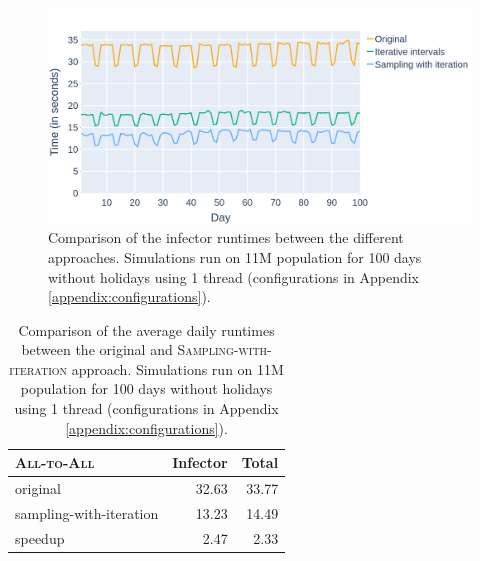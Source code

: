 \begin{figure}
    \centering
    \includegraphics[width=\linewidth]{4 - Sampling/fig/sampling_with_iteration/swi_vs_rest_infector.png}
    \caption{Comparison of the infector runtimes between the different approaches.  Simulations run on 11M population for 100 days without holidays using 1 thread (configurations in Appendix \ref{appendix:configurations}).}
    \label{fig:swi_vs_rest_infector}
\end{figure}

\begin{table}
    \centering
    \begin{tabular}{@{}lrr@{}}
        \toprule
        \textsc{All-to-All} & Infector & Total \\ \midrule
        original & 32.63 & 33.77 \\
        sampling-with-iteration & 13.23 & 14.49 \\ \hdashline[1pt/1pt]
        speedup & 2.47 & 2.33 \\ \bottomrule
    \end{tabular}
    \caption{Comparison of the average daily runtimes between the original and \textsc{Sampling-with-iteration} approach. Simulations run on 11M population for 100 days without holidays using 1 thread (configurations in Appendix \ref{appendix:configurations}).}
    \label{tab:swi_vs_standard_runtimes}
\end{table}

